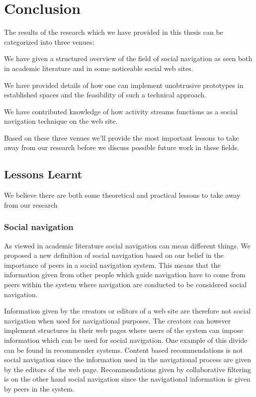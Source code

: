 \chapter{Conclusion}
\label{chapter:conclusion}

The results of the research which we have provided in this thesis can be
categorized into three venues:

\begin{enum}
  \item We have given a structured overview of the field of social navigation
    as seen both in academic literature and in some noticeable social web
    sites.
  \item We have provided details of how one can implement unobtrusive
    prototypes in established spaces and the feasibility of such a technical
    approach.
  \item We have contributed knowledge of how activity streams functions as
    a social navigation technique on the \urort{} web site.
\end{enum}

Based on these three venues we'll provide the most important lessons to take
away from our research before we discuss possible future work in these fields.

\section{Lessons Learnt}

We believe there are both some theoretical and practical lessons to take away
from our research

\subsection{Social navigation}

As viewed in academic literature social navigation can mean different things.
We proposed a new definition of social navigation based on our belief in the
importance of peers in a social navigation system.%
This means that the information given from other people which guide navigation
have to come from peers within the system where navigation are conducted to be
considered social navigation.

Information given by the creators or 
editors of a web site are therefore not social navigation when used for
navigational purposes.
The creators can however implement structures in their web pages where users
of the system can impose information which can be used for social navigation.
One example of this divide can be found in recommender systems. Content based
recommendations is not social navigation since the information used
in the navigational process are given by the editors of the web page.
Recommendations given by collaborative filtering is on the other hand social
navigation since the navigational information is given by peers in the system.

